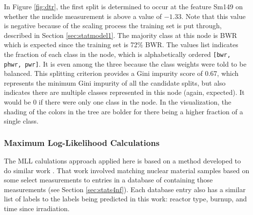 In Figure \ref{fig:dtr}, the first split is determined to occur at the feature
Sm149 on whether the nuclide measurement is above a value of $-1.33$. Note that
this value is negative because of the scaling process the training set is put
through, described in Section \ref{sec:statmodel1}. The majority class at this
node is \gls{BWR} which is expected since the training set is 72\% \gls{BWR}.
The values list indicates the fraction of each class in the node, which is
alphabetically ordered \texttt{[bwr, phwr, pwr]}. It is even among the three
because the class weights were told to be balanced.  This splitting criterion
provides a Gini impurity score of 0.67, which represents the minimum Gini
impurity of all the candidate splits, but also indicates there are multiple
classes represented in this node (again, expected).  It would be 0 if there
were only one class in the node.  In the visualization, the shading of the
colors in the tree are bolder for there being a higher fraction of a single
class.

\subsubsection{Maximum Log-Likelihood Calculations}

The \gls{MLL} calulations approach applied here is based on a method developed
to do similar work \cite{mll_method, mll_validate, mll_sensitivity}.  That work
involved matching nuclear material samples based on some select measurements to
entries in a database of containing those measurements (see Section
\ref{sec:stats4nf}).  Each database entry also has a similar list of labels to
the labels being predicted in this work: reactor type, burnup, and time since
irradiation.

